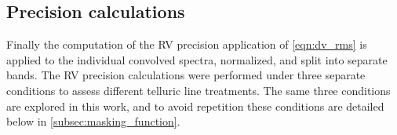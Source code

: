 \subsection{Precision calculations}
\label{subsec:orginal_rv_calc}
Finally the computation of the {RV} precision application of \cref{eqn:dv_rms} is applied to the individual convolved spectra, normalized, and split into separate bands.
The {RV} precision calculations were performed under three separate conditions to assess different telluric line treatments.
The same three conditions are explored in this work, and to avoid repetition these conditions are detailed below in \cref{subsec:masking_function}.
